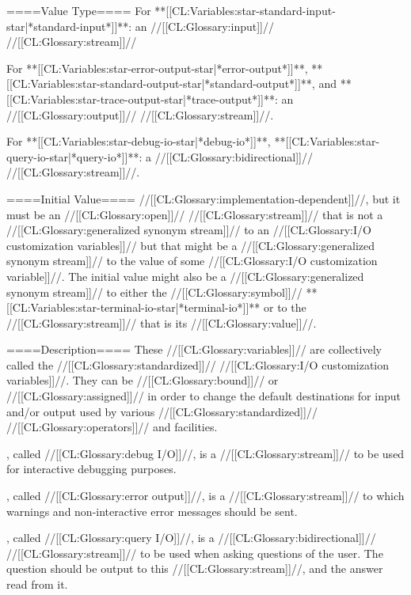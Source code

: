 
====Value Type====
For **[[CL:Variables:star-standard-input-star|*standard-input*]]**: an //[[CL:Glossary:input]]// //[[CL:Glossary:stream]]//

For **[[CL:Variables:star-error-output-star|*error-output*]]**, **[[CL:Variables:star-standard-output-star|*standard-output*]]**, and **[[CL:Variables:star-trace-output-star|*trace-output*]]**: an //[[CL:Glossary:output]]// //[[CL:Glossary:stream]]//.

For **[[CL:Variables:star-debug-io-star|*debug-io*]]**, **[[CL:Variables:star-query-io-star|*query-io*]]**: a //[[CL:Glossary:bidirectional]]// //[[CL:Glossary:stream]]//.

====Initial Value====
//[[CL:Glossary:implementation-dependent]]//, but it must be an //[[CL:Glossary:open]]// //[[CL:Glossary:stream]]// that is not a //[[CL:Glossary:generalized synonym stream]]// to an //[[CL:Glossary:I/O customization variables]]// but that might be a //[[CL:Glossary:generalized synonym stream]]// to the value of some //[[CL:Glossary:I/O customization variable]]//. The initial value might also be a //[[CL:Glossary:generalized synonym stream]]// to either the //[[CL:Glossary:symbol]]// **[[CL:Variables:star-terminal-io-star|*terminal-io*]]** or to the //[[CL:Glossary:stream]]// that is its //[[CL:Glossary:value]]//.

====Description====
These //[[CL:Glossary:variables]]// are collectively called the //[[CL:Glossary:standardized]]// //[[CL:Glossary:I/O customization variables]]//. They can be //[[CL:Glossary:bound]]// or //[[CL:Glossary:assigned]]// in order to change the default destinations for input and/or output used by various //[[CL:Glossary:standardized]]// //[[CL:Glossary:operators]]// and facilities.

, called //[[CL:Glossary:debug I/O]]//, is a //[[CL:Glossary:stream]]// to be used for interactive debugging purposes.

, called //[[CL:Glossary:error output]]//, is a //[[CL:Glossary:stream]]// to which warnings and non-interactive error messages should be sent.

, called //[[CL:Glossary:query I/O]]//, is a //[[CL:Glossary:bidirectional]]// //[[CL:Glossary:stream]]// to be used when asking questions of the user. The question should be output to this //[[CL:Glossary:stream]]//, and the answer read from it.

